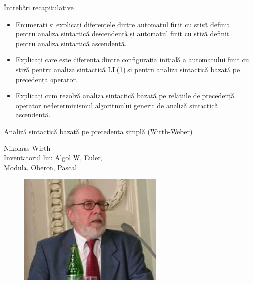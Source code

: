 \documentclass[pdf]{beamer}
\begin{document}
\begin{frame}{Întrebări recapitulative}
\begin{itemize}
\item
Enumerați și explicați diferențele dintre automatul finit cu stivă definit pentru analiza sintactică descendentă și automatul finit cu stivă definit pentru analiza sintactică ascendentă.
\newline

\item
Explicați care este diferența dintre configurația inițială a automatului finit cu stivă pentru analiza sintactică LL(1) și pentru analiza sintactică bazată pe precedența operator.
\newline

\item
Explicați cum rezolvă analiza sintactică bazată pe relațiile de precedență operator nedeterminismul algoritmului generic de analiză sintactică ascendentă.
\newline

\end{itemize}
\end{frame}






\begin{frame}{Analiză sintactică bazată pe precedența simplă (Wirth-Weber)}

\vfill
\begin{center}
Nikolaus Wirth\\
Inventatorul lui: Algol W, Euler,\\
Modula, Oberon, Pascal
\begin{figure}[b]
\includegraphics[scale=0.5]{img/Nikolaus.jpg}
\end{figure}
\end{center}
\end{frame}
\end{document}

